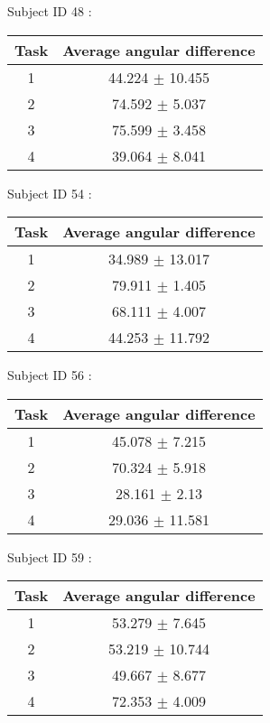 \documentclass[12pt]{article}
\begin{document}
\par Subject ID  48 :
\begin{center}
\begin{tabular}{|c|c|}
\hline
 Task & Average angular difference \\ \hline
1  &  44.224 $\pm$ 10.455 \\
2  &  74.592 $\pm$ 5.037 \\
3  &  75.599 $\pm$ 3.458 \\
4  &  39.064 $\pm$ 8.041 \\
\hline
\end{tabular}
\end{center}

\par Subject ID  54 :
\begin{center}
\begin{tabular}{|c|c|}
\hline
 Task & Average angular difference \\ \hline
1  &  34.989 $\pm$ 13.017 \\
2  &  79.911 $\pm$ 1.405 \\
3  &  68.111 $\pm$ 4.007 \\
4  &  44.253 $\pm$ 11.792 \\
\hline
\end{tabular}
\end{center}

\par Subject ID  56 :
\begin{center}
\begin{tabular}{|c|c|}
\hline
 Task & Average angular difference \\ \hline
1  &  45.078 $\pm$ 7.215 \\
2  &  70.324 $\pm$ 5.918 \\
3  &  28.161 $\pm$ 2.13 \\
4  &  29.036 $\pm$ 11.581 \\
\hline
\end{tabular}
\end{center}

\par Subject ID  59 :
\begin{center}
\begin{tabular}{|c|c|}
\hline
 Task & Average angular difference \\ \hline
1  &  53.279 $\pm$ 7.645 \\
2  &  53.219 $\pm$ 10.744 \\
3  &  49.667 $\pm$ 8.677 \\
4  &  72.353 $\pm$ 4.009 \\
\hline
\end{tabular}
\end{center}
\end{document}
